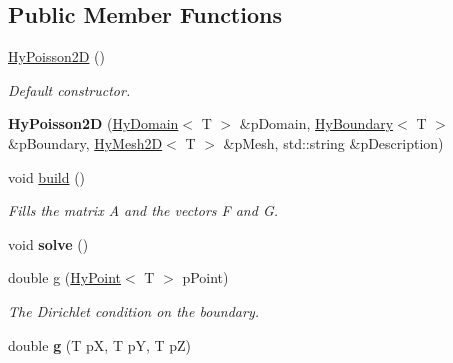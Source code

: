 \subsection*{Public Member Functions}
\begin{DoxyCompactItemize}
\item 
\hypertarget{classHyPoisson2D_a1ce5db0977faea87271b5c48c89121bc}{
\hyperlink{classHyPoisson2D_a1ce5db0977faea87271b5c48c89121bc}{HyPoisson2D} ()}
\label{classHyPoisson2D_a1ce5db0977faea87271b5c48c89121bc}

\begin{DoxyCompactList}\small\item\em Default constructor. \item\end{DoxyCompactList}\item 
\hypertarget{classHyPoisson2D_a090399fc99e38625d92397aae07d5732}{
{\bfseries HyPoisson2D} (\hyperlink{classHyDomain}{HyDomain}$<$ T $>$ \&pDomain, \hyperlink{classHyBoundary}{HyBoundary}$<$ T $>$ \&pBoundary, \hyperlink{classHyMesh2D}{HyMesh2D}$<$ T $>$ \&pMesh, std::string \&pDescription)}
\label{classHyPoisson2D_a090399fc99e38625d92397aae07d5732}

\item 
\hypertarget{classHyPoisson2D_a4b5fa83627d8a1ec9716888d69217034}{
void \hyperlink{classHyPoisson2D_a4b5fa83627d8a1ec9716888d69217034}{build} ()}
\label{classHyPoisson2D_a4b5fa83627d8a1ec9716888d69217034}

\begin{DoxyCompactList}\small\item\em Fills the matrix A and the vectors F and G. \item\end{DoxyCompactList}\item 
\hypertarget{classHyPoisson2D_a905070be03612344705d81e72759ba32}{
void {\bfseries solve} ()}
\label{classHyPoisson2D_a905070be03612344705d81e72759ba32}

\item 
double \hyperlink{classHyPoisson2D_a9c27e90e3abb3a6ebe5d6b3274412e7a}{g} (\hyperlink{classHyPoint}{HyPoint}$<$ T $>$ pPoint)
\begin{DoxyCompactList}\small\item\em The Dirichlet condition on the boundary. \item\end{DoxyCompactList}\item 
\hypertarget{classHyPoisson2D_a26b5243fcf822a4009abeb72fb8cb01d}{
double {\bfseries g} (T pX, T pY, T pZ)}
\label{classHyPoisson2D_a26b5243fcf822a4009abeb72fb8cb01d}


\end{DoxyCompactItemize}

